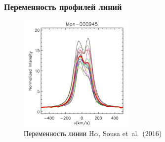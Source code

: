 \documentclass{beamer}
\def\etal{{et~al.}}
\begin{document}
\begin{frame}
\frametitle{Переменность профилей линий}
\begin{figure}[h]
\centering
\includegraphics[width=0.5\textwidth]{profilevar.png}
\caption{Переменность линии H$\alpha$, Sousa \etal\ (2016)}
\end{figure} 
\end{frame}

\end{document}
